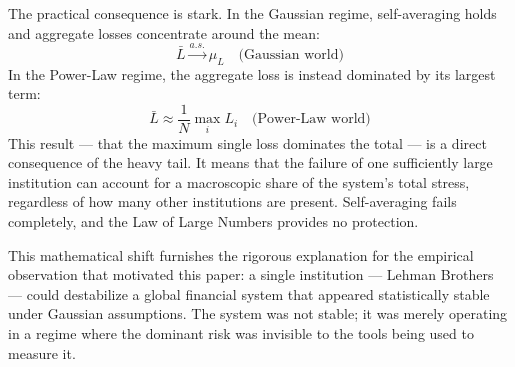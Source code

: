 \documentclass[a4paper,12pt,twoside]{article}
\begin{document}
The practical consequence is stark. In the Gaussian regime, 
self-averaging holds and aggregate losses concentrate around the mean:
\begin{equation}
    \bar{L} \xrightarrow{a.s.} \mu_L \quad \text{(Gaussian world)}
\end{equation}
In the Power-Law regime, the aggregate loss is instead dominated by 
its largest term:
\begin{equation}
    \bar{L} \approx \frac{1}{N} \max_{i} L_i 
    \quad \text{(Power-Law world)}
\end{equation}
This result — that the maximum single loss dominates the total — is a 
direct consequence of the heavy tail. It means that the failure of one 
sufficiently large institution can account for a macroscopic share of 
the system's total stress, regardless of how many other institutions 
are present. Self-averaging fails completely, and the Law of Large 
Numbers provides no protection.

This mathematical shift furnishes the rigorous explanation for the 
empirical observation that motivated this paper: a single institution 
— Lehman Brothers — could destabilize a global financial system that 
appeared statistically stable under Gaussian assumptions. The system 
was not stable; it was merely operating in a regime where the dominant 
risk was invisible to the tools being used to measure it.
\end{document}
